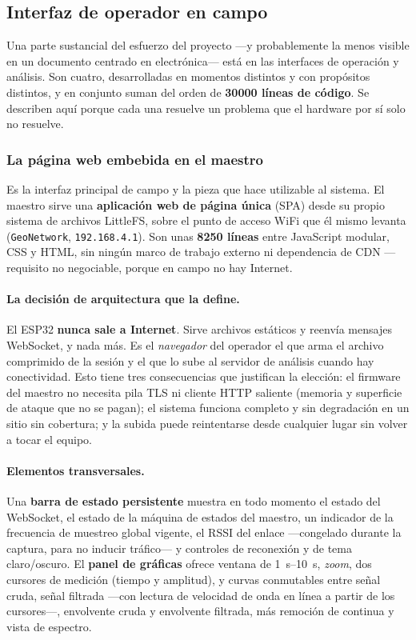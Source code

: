 \subsection{Interfaz de operador en campo}
\label{sec:arq-interfaces}

Una parte sustancial del esfuerzo del proyecto ---y probablemente la menos visible en un
documento centrado en electr\'onica--- est\'a en las interfaces de operaci\'on y an\'alisis.
Son cuatro, desarrolladas en momentos distintos y con prop\'ositos distintos, y en
conjunto suman del orden de \textbf{\num{30000} l\'ineas de c\'odigo}. Se describen aqu\'i
porque cada una resuelve un problema que el hardware por s\'i solo no resuelve.

\subsubsection{La p\'agina web embebida en el maestro}
\label{sec:arq-spa-esp}

Es la interfaz principal de campo y la pieza que hace utilizable al sistema. El maestro
sirve una \textbf{aplicaci\'on web de p\'agina \'unica} (SPA) desde su propio sistema de
archivos LittleFS, sobre el punto de acceso WiFi que \'el mismo levanta
(\texttt{GeoNetwork}, \texttt{192.168.4.1}). Son unas \textbf{\num{8250} l\'ineas} entre
JavaScript modular, CSS y HTML, sin ning\'un marco de trabajo externo ni dependencia de
CDN ---requisito no negociable, porque en campo no hay Internet.

\paragraph{La decisi\'on de arquitectura que la define.} El ESP32 \textbf{nunca sale a
Internet}. Sirve archivos est\'aticos y reenv\'ia mensajes WebSocket, y nada m\'as. Es el
\emph{navegador} del operador el que arma el archivo comprimido de la sesi\'on y el que
lo sube al servidor de an\'alisis cuando hay conectividad. Esto tiene tres consecuencias
que justifican la elecci\'on: el firmware del maestro no necesita pila TLS ni cliente
HTTP saliente (memoria y superficie de ataque que no se pagan); el sistema funciona
completo y sin degradaci\'on en un sitio sin cobertura; y la subida puede reintentarse
desde cualquier lugar sin volver a tocar el equipo.

\paragraph{Elementos transversales.} Una \textbf{barra de estado persistente} muestra en
todo momento el estado del WebSocket, el estado de la m\'aquina de estados del maestro, un
indicador de la frecuencia de muestreo global vigente, el RSSI del enlace ---congelado
durante la captura, para no inducir tr\'afico--- y controles de reconexi\'on y de tema
claro/oscuro. El \textbf{panel de gr\'aficas} ofrece ventana de \SIrange{1}{10}{\second},
\emph{zoom}, dos cursores de medici\'on (tiempo y amplitud), y curvas conmutables entre
se\~nal cruda, se\~nal filtrada ---con lectura de velocidad de onda en l\'inea a partir de
los cursores---, envolvente cruda y envolvente filtrada, m\'as remoci\'on de continua y
vista de espectro.

